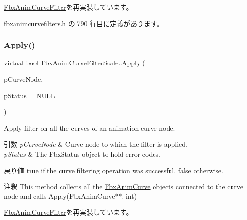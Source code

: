 \hyperlink{class_fbx_anim_curve_filter_aca6a41fbc4d9019b20df7adccfa6ed3c}{Fbx\+Anim\+Curve\+Filter}を再実装しています。



 fbxanimcurvefilters.\+h の 790 行目に定義があります。

\mbox{\label{class_fbx_anim_curve_filter_scale_abec5cc73d37bef6e8ab3127ed09b21a3}} 
\subsubsection{\texorpdfstring{Apply()}{Apply()}\hspace{0.1cm}{\footnotesize\ttfamily [4/5]}}
{\footnotesize\ttfamily virtual bool Fbx\+Anim\+Curve\+Filter\+Scale\+::\+Apply (\begin{DoxyParamCaption}\item[{\hyperlink{class_fbx_anim_curve_node}{Fbx\+Anim\+Curve\+Node} \&}]{p\+Curve\+Node,  }\item[{\hyperlink{class_fbx_status}{Fbx\+Status} $\ast$}]{p\+Status = {\ttfamily \hyperlink{fbxarch_8h_a070d2ce7b6bb7e5c05602aa8c308d0c4}{N\+U\+LL}} }\end{DoxyParamCaption})\hspace{0.3cm}{\ttfamily [virtual]}}

Apply filter on all the curves of an animation curve node. 
\begin{DoxyParams}{引数}
{\em p\+Curve\+Node} & Curve node to which the filter is applied. \\
\hline
{\em p\+Status} & The \hyperlink{class_fbx_status}{Fbx\+Status} object to hold error codes. \\
\hline
\end{DoxyParams}
\begin{DoxyReturn}{戻り値}
{\ttfamily true} if the curve filtering operation was successful, {\ttfamily false} otherwise. 
\end{DoxyReturn}
\begin{DoxyRemark}{注釈}
This method collects all the \hyperlink{class_fbx_anim_curve}{Fbx\+Anim\+Curve} objects connected to the curve node and calls Apply(\+Fbx\+Anim\+Curve$\ast$$\ast$, int) 
\end{DoxyRemark}


\hyperlink{class_fbx_anim_curve_filter_ad042b45c0675278fa49e61739b0825c2}{Fbx\+Anim\+Curve\+Filter}を再実装しています。

